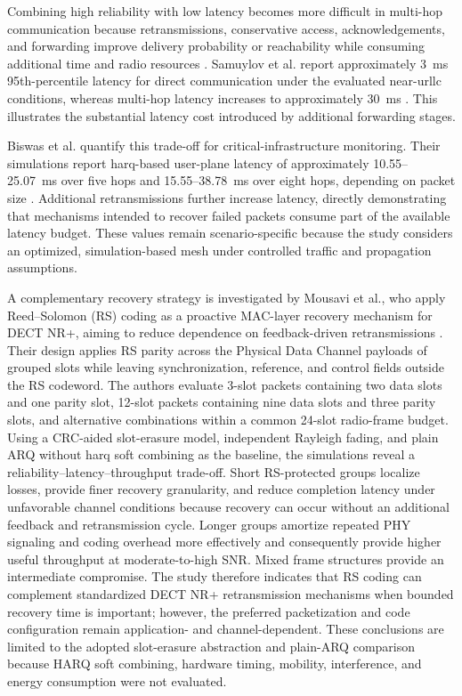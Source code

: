 Combining high reliability with low latency becomes more difficult in
multi-hop communication because retransmissions, conservative access,
acknowledgements, and forwarding improve delivery probability or reachability
while consuming additional time and radio resources
\cite{samuylovPerformanceMACLayer2024a,
glazkovImprovingNearURLLCServices2025}. Samuylov et al. report approximately
3~ms 95th-percentile latency for direct communication under the evaluated
near-\gls{urllc} conditions, whereas multi-hop latency increases to
approximately 30~ms
\cite{samuylovEmpoweringNearURLLCIoT2025}. This illustrates the substantial
latency cost introduced by additional forwarding stages.

Biswas et al. quantify this trade-off for critical-infrastructure monitoring.
Their simulations report \gls{harq}-based user-plane latency of approximately
10.55--25.07~ms over five hops and 15.55--38.78~ms over eight hops, depending
on packet size
\cite{biswasReliableLowLatencyCommunications2024}. Additional retransmissions
further increase latency, directly demonstrating that mechanisms intended to
recover failed packets consume part of the available latency budget. These
values remain scenario-specific because the study considers an optimized,
simulation-based mesh under controlled traffic and propagation assumptions.

A complementary recovery strategy is investigated by Mousavi et al., who
apply Reed--Solomon (RS) coding as a proactive MAC-layer recovery mechanism
for DECT NR+, aiming to reduce dependence on feedback-driven retransmissions
\cite{mousaviPerformanceRS2026}. Their design applies RS parity across the Physical Data
Channel payloads of grouped slots while leaving synchronization, reference,
and control fields outside the RS codeword. The authors evaluate 3-slot
packets containing two data slots and one parity slot, 12-slot packets
containing nine data slots and three parity slots, and alternative
combinations within a common 24-slot radio-frame budget. Using a CRC-aided
slot-erasure model, independent Rayleigh fading, and plain ARQ without
\gls{harq} soft combining as the baseline, the simulations reveal a
reliability--latency--throughput trade-off. Short RS-protected groups localize
losses, provide finer recovery granularity, and reduce completion latency
under unfavorable channel conditions because recovery can occur without an
additional feedback and retransmission cycle. Longer groups amortize repeated
PHY signaling and coding overhead more effectively and consequently provide
higher useful throughput at moderate-to-high SNR. Mixed frame structures
provide an intermediate compromise. The study therefore indicates that RS
coding can complement standardized DECT NR+ retransmission mechanisms when
bounded recovery time is important; however, the preferred packetization and
code configuration remain application- and channel-dependent. These
conclusions are limited to the adopted slot-erasure abstraction and plain-ARQ
comparison because HARQ soft combining, hardware timing, mobility,
interference, and energy consumption were not evaluated.

